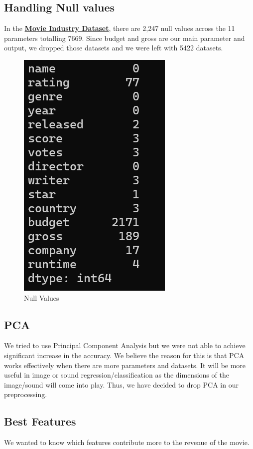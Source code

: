 \documentclass[conference]{IEEEtran}
\begin{document}
        \subsection*{Handling Null values}
            In the \href{https://www.kaggle.com/datasets/danielgrijalvas/movies}{\textbf{Movie Industry Dataset}}, there are 2,247 null values across the 11 parameters totalling 7669.
            Since budget and gross are our main parameter and output, we dropped those datasets and we were left with 5422 datasets.
            
            \begin{figure}
                \centering \includegraphics[width=0.4\linewidth]{null-values.png}
                \caption{Null Values}
                \label{fig:null-values}
            \end{figure}
            
        \subsection*{PCA}
            We tried to use Principal Component Analysis but we were not able to achieve significant increase in the accuracy.
            We believe the reason for this is that PCA works effectively when there are more parameters and datasets.
            It will be more useful in image or sound regression/classification as the dimensions of the image/sound will come into play.
            Thus, we have decided to drop PCA in our preprocessing.
            
        \subsection*{Best Features}
            We wanted to know which features contribute more to the revenue of the movie.
            
\end{document}
